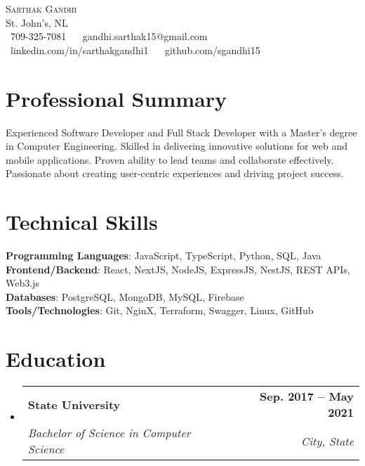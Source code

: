 \documentclass[letterpaper,11pt]{article}
\makeatletter
\newcommand{\resumeSubheading}[4]{
  \vspace{-2pt}\item
    \begin{tabular*}{1.0\textwidth}[t]{l@{\extracolsep{\fill}}r}
      \textbf{#1} & \textbf{\small #2} \\
      \textit{\small#3} & \textit{\small #4} \\
    \end{tabular*}\vspace{-7pt}
}
\newcommand{\resumeSubHeadingListStart}{\begin{itemize}[leftmargin=0.0in, label={}]}
\newcommand{\resumeSubHeadingListEnd}{\end{itemize}}
\makeatother
\begin{document}
\begin{center}
    {\Huge \scshape Sarthak Gandhi} \\ \vspace{1pt}
    St. John's, NL \\ \vspace{1pt}
    \small \raisebox{-0.1\height}\faPhone\ 709-325-7081 ~ 
    {\raisebox{-0.2\height}\faEnvelope\  {gandhi.sarthak15@gmail.com}} ~ 
    {\raisebox{-0.2\height}\faLinkedin\ {linkedin.com/in/sarthakgandhi1}}  ~
    {\raisebox{-0.2\height}\faGithub\ {github.com/sgandhi15}}
    \vspace{-8pt}
\end{center}


\section{Professional Summary}
Experienced Software Developer and Full Stack Developer with a Master’s degree in Computer Engineering. Skilled in delivering innovative solutions for web and mobile applications. Proven ability to lead teams and collaborate effectively. Passionate about creating user-centric experiences and driving project success.
\vspace{-8pt}

\section{Technical Skills}
\begin{itemize}[leftmargin=0.15in, label={}]
\small{\item{
\textbf{Programming Languages}{: JavaScript, TypeScript, Python, SQL, Java} \\
\textbf{Frontend/Backend}{: React, NextJS, NodeJS, ExpressJS, NestJS, REST APIs, Web3.js} \\
\textbf{Databases}{: PostgreSQL, MongoDB, MySQL, Firebase} \\
\textbf{Tools/Technologies}{: Git, NginX, Terraform, Swagger, Linux, GitHub} \
}}
\end{itemize}
\vspace{-16pt}

\section{Education}
  \resumeSubHeadingListStart
    \resumeSubheading
      {State University}{Sep. 2017 -- May 2021}
      {Bachelor of Science in Computer Science}{City, State}
  \resumeSubHeadingListEnd
\end{document}
